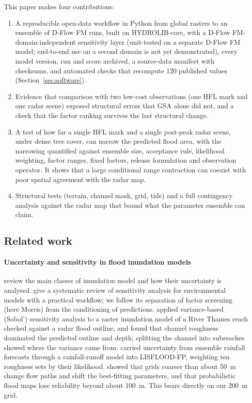 \documentclass[preprint,12pt,authoryear]{elsarticle}
\begin{document}
This paper makes four contributions:
\begin{enumerate}
\item A reproducible open-data workflow in Python from global rasters to an ensemble of D-Flow FM runs, built on HYDROLIB-core, with a D-Flow FM-domain-independent sensitivity layer (unit-tested on a separate D-Flow FM model; end-to-end use on a second domain is not yet demonstrated), every model version, run and score archived, a source-data manifest with checksums, and automated checks that recompute 120 published values (Section~\ref{sec:software}).
\item Evidence that comparison with two low-cost observations (one HFL mark and one radar scene) exposed structural errors that GSA alone did not, and a check that the factor ranking survives the last structural change.
\item A test of how far a single HFL mark and a single post-peak radar scene, under dense tree cover, can narrow the predicted flood area, with the narrowing quantified against ensemble size, acceptance rule, likelihood weighting, factor ranges, fixed factors, release formulation and observation operator. It shows that a large conditional range contraction can coexist with poor spatial agreement with the radar map.
\item Structural tests (terrain, channel mask, grid, tide) and a full contingency analysis against the radar map that bound what the parameter ensemble can claim.
\end{enumerate}

\subsection{Related work}

\paragraph{Uncertainty and sensitivity in flood inundation models}
\citet{teng2017} review the main classes of inundation model and how their uncertainty is analysed. \citet{pianosi2016} give a systematic review of sensitivity analysis for environmental models with a practical workflow; we follow its separation of factor screening (here Morris) from the conditioning of predictions. \citet{hall2005} applied variance-based (Sobol') sensitivity analysis to a raster inundation model of a River Thames reach checked against a radar flood outline, and found that channel roughness dominated the predicted outline and depth; splitting the channel into subreaches showed where the variance came from. \citet{pappenberger2005} carried uncertainty from ensemble rainfall forecasts through a rainfall-runoff model into LISFLOOD-FP, weighting ten roughness sets by their likelihood. \citet{savage2016} showed that grids coarser than about 50~m change flow paths and shift the best-fitting parameters, and that probabilistic flood maps lose reliability beyond about 100~m. This bears directly on our 200~m grid.
\end{document}
